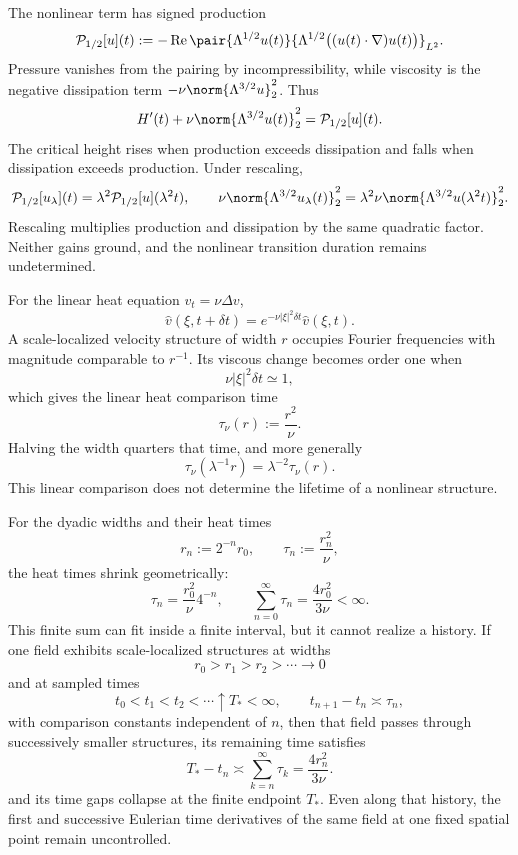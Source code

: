 The nonlinear term has signed production
\[
  \mathcal P_{1/2}[u](t)
  :=
  -\operatorname{Re}
  \pair
    {\Lambda^{1/2}u(t)}
    {\Lambda^{1/2}\bigl((u(t)\cdot\nabla)u(t)\bigr)}_{L^2}.
\]
Pressure vanishes from the pairing by incompressibility, while viscosity is the negative dissipation term \(-\nu\norm{\Lambda^{3/2}u}_2^2\). Thus
\[
  H'(t)
  +
  \nu\norm{\Lambda^{3/2}u(t)}_2^2
  =
  \mathcal P_{1/2}[u](t).
\]
The critical height rises when production exceeds dissipation and falls when dissipation exceeds production. Under rescaling,
\[
  \mathcal P_{1/2}[u_\lambda](t)
  =
  \lambda^2\mathcal P_{1/2}[u](\lambda^2t),
  \qquad
  \nu\norm{\Lambda^{3/2}u_\lambda(t)}_2^2
  =
  \lambda^2\nu\norm{\Lambda^{3/2}u(\lambda^2t)}_2^2.
\]
Rescaling multiplies production and dissipation by the same quadratic factor. Neither gains ground, and the nonlinear transition duration remains undetermined.


For the linear heat equation \(v_t=\nu\Delta v\),
\[
  \widehat v(\xi,t+\delta t)
  =
  e^{-\nu|\xi|^2\delta t}\widehat v(\xi,t).
\]
A scale-localized velocity structure of width \(r\) occupies Fourier frequencies with magnitude comparable to \(r^{-1}\). Its viscous change becomes order one when
\[
  \nu|\xi|^2\delta t\simeq1,
\]
which gives the linear heat comparison time
\[
  \tau_\nu(r)
  :=
  \frac{r^2}{\nu}.
\]
Halving the width quarters that time, and more generally
\[
  \tau_\nu(\lambda^{-1}r)
  =
  \lambda^{-2}\tau_\nu(r).
\]
This linear comparison does not determine the lifetime of a nonlinear structure.


For the dyadic widths and their heat times
\[
  r_n:=2^{-n}r_0,
  \qquad
  \tau_n:=\frac{r_n^2}{\nu},
\]
the heat times shrink geometrically:
\[
  \tau_n
  =
  \frac{r_0^2}{\nu}4^{-n},
  \qquad
  \sum_{n=0}^{\infty}\tau_n
  =
  \frac{4r_0^2}{3\nu}
  <
  \infty.
\]
This finite sum can fit inside a finite interval, but it cannot realize a history. If one \NavierStokes{} field exhibits scale-localized structures at widths
\[
  r_0>r_1>r_2>\cdots\longrightarrow0
\]
and at sampled times
\[
  t_0<t_1<t_2<\cdots\uparrow T_*<\infty,
  \qquad
  t_{n+1}-t_n\asymp\tau_n,
\]
with comparison constants independent of \(n\), then that field passes through successively smaller structures, its remaining time satisfies
\[
  T_*-t_n
  \asymp
  \sum_{k=n}^{\infty}\tau_k
  =
  \frac{4r_n^2}{3\nu}.
\]
and its time gaps collapse at the finite endpoint \(T_*\). Even along that history, the first and successive Eulerian time derivatives of the same field at one fixed spatial point remain uncontrolled.
